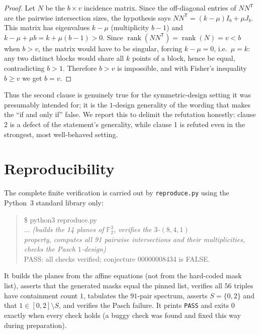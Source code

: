\documentclass[11pt]{article}
\theoremstyle{definition}
\theoremstyle{remark}
\newcommand{\F}{\mathbb{F}}
\begin{document}
\begin{proof}
Let $N$ be the $b \times v$ incidence matrix. Since the off-diagonal entries of
$NN^{\mathsf T}$ are the pairwise intersection sizes, the hypothesis says
$NN^{\mathsf T} = (k-\mu) I_b + \mu J_b$. This matrix has eigenvalues
$k-\mu$ (multiplicity $b-1$) and $k-\mu+\mu b = k + \mu(b-1) > 0$. Since
$\operatorname{rank}(NN^{\mathsf T}) = \operatorname{rank}(N) = v < b$ when
$b > v$, the matrix would have to be singular, forcing $k - \mu = 0$, i.e.\
$\mu = k$: any two distinct blocks would share all $k$ points of a block,
hence be equal, contradicting $b > 1$. Therefore $b > v$ is impossible, and
with Fisher's inequality $b \geq v$ we get $b = v$.
\end{proof}

Thus the second clause is genuinely true for the symmetric-design setting it
was presumably intended for; it is the $1$-design generality of the wording
that makes the ``if and only if'' false. We report this to delimit the
refutation honestly: clause 2 is a defect of the statement's generality, while
clause 1 is refuted even in the strongest, most well-behaved setting.

\section{Reproducibility}

The complete finite verification is carried out by \texttt{reproduce.py}
using the Python~3 standard library only:

\begin{quote}\ttfamily\raggedright
\$ python3 reproduce.py\\
... \textit{(builds the 14 planes of $\F_2^3$, verifies the $3$-$(8,4,1)$\\
property, computes all 91 pairwise intersections and their multiplicities,\\
checks the Pasch $1$-design)}\\
PASS: all checks verified; conjecture 00000008434 is FALSE.
\end{quote}

It builds the planes from the affine equations (not from the hard-coded mask
list), asserts that the generated masks equal the pinned list, verifies all
$56$ triples have containment count $1$, tabulates the $91$-pair spectrum,
asserts $S = \{0,2\}$ and that $1 \in [0,2] \setminus S$, and verifies the
Pasch failure. It prints \texttt{PASS} and exits $0$ exactly when every check
holds (a buggy check was found and fixed this way during preparation).
\end{document}
